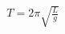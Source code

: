 \documentclass[preview]{standalone}
\begin{document}
\begin{align*}
T = 2\pi\sqrt{\frac{L}{g}}
\end{align*}
\end{document}
